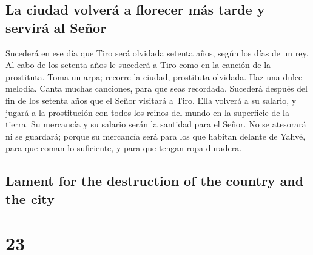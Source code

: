 \begin{paracol}{2}
\hypertarget{la-ciudad-volveruxe1-a-florecer-muxe1s-tarde-y-serviruxe1-al-seuxf1or}{%
\subsection{La ciudad volverá a florecer más tarde y servirá al
Señor}\label{la-ciudad-volveruxe1-a-florecer-muxe1s-tarde-y-serviruxe1-al-seuxf1or}}

 Sucederá en ese día que Tiro será olvidada setenta años,
según los días de un rey. Al cabo de los setenta años le sucederá a Tiro
como en la canción de la prostituta.  Toma un arpa;
recorre la ciudad, prostituta olvidada. Haz una dulce melodía. Canta
muchas canciones, para que seas recordada.  Sucederá
después del fin de los setenta años que el Señor visitará a Tiro. Ella
volverá a su salario, y jugará a la prostitución con todos los reinos
del mundo en la superficie de la tierra.  Su mercancía y
su salario serán la santidad para el Señor. No se atesorará ni se
guardará; porque su mercancía será para los que habitan delante de
Yahvé, para que coman lo suficiente, y para que tengan ropa duradera.

\switchcolumn
\begin{otherlanguage}{english}

\hypertarget{lament-for-the-destruction-of-the-country-and-the-city}{%
\subsection{Lament for the destruction of the country and the
city}\label{lament-for-the-destruction-of-the-country-and-the-city}}

\hypertarget{section-45}{%
\section{23}\label{section-45}}


\end{otherlanguage}
\end{paracol}
